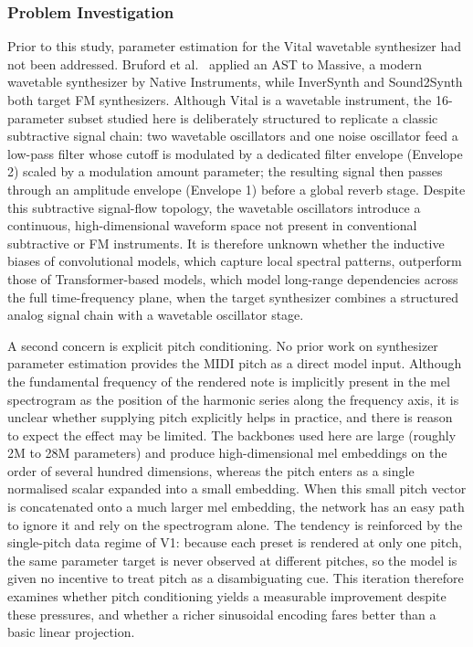 \subsubsection{Problem Investigation}

\noindent
Prior to this study, parameter estimation for the Vital wavetable synthesizer had not been addressed. Bruford et al.\ \cite{bruford2024ast} applied an AST to Massive, a modern wavetable synthesizer by Native Instruments, while InverSynth \cite{barkan2019inversynth} and Sound2Synth \cite{chen2022sound2synth} both target FM synthesizers. Although Vital is a wavetable instrument, the 16-parameter subset studied here is deliberately structured to replicate a classic subtractive signal chain: two wavetable oscillators and one noise oscillator feed a low-pass filter whose cutoff is modulated by a dedicated filter envelope (Envelope 2) scaled by a modulation amount parameter; the resulting signal then passes through an amplitude envelope (Envelope 1) before a global reverb stage. Despite this subtractive signal-flow topology, the wavetable oscillators introduce a continuous, high-dimensional waveform space not present in conventional subtractive or FM instruments. It is therefore unknown whether the inductive biases of convolutional models, which capture local spectral patterns, outperform those of Transformer-based models, which model long-range dependencies across the full time-frequency plane, when the target synthesizer combines a structured analog signal chain with a wavetable oscillator stage.

\noindent \newline
A second concern is explicit pitch conditioning. No prior work on synthesizer parameter estimation provides the MIDI pitch as a direct model input. Although the fundamental frequency of the rendered note is implicitly present in the mel spectrogram as the position of the harmonic series along the frequency axis, it is unclear whether supplying pitch explicitly helps in practice, and there is reason to expect the effect may be limited. The backbones used here are large (roughly 2M to 28M parameters) and produce high-dimensional mel embeddings on the order of several hundred dimensions, whereas the pitch enters as a single normalised scalar expanded into a small embedding. When this small pitch vector is concatenated onto a much larger mel embedding, the network has an easy path to ignore it and rely on the spectrogram alone. The tendency is reinforced by the single-pitch data regime of V1: because each preset is rendered at only one pitch, the same parameter target is never observed at different pitches, so the model is given no incentive to treat pitch as a disambiguating cue. This iteration therefore examines whether pitch conditioning yields a measurable improvement despite these pressures, and whether a richer sinusoidal encoding fares better than a basic linear projection.

